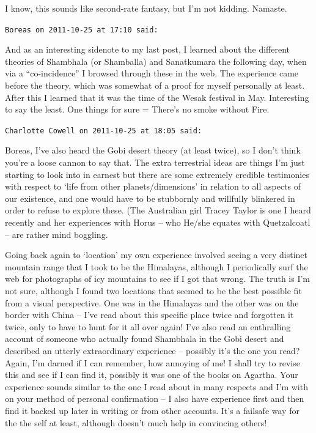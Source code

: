 \begin{footnotesize}
\begin{sffamily}
I know, this sounds like second-rate fantasy, but I'm not kidding. Namaste.

\hfill

\texttt{Boreas on 2011-10-25 at 17:10 said:}

And as an interesting sidenote to my last post, I learned about the different theories of Shambhala (or Shamballa) and Sanatkumara the following day, when via a ``co-incidence'' I browsed through these in the web. The experience came before the theory, which was somewhat of a proof for myself personally at least. After this I learned that it was the time of the Wesak festival in May. Interesting to say the least. One things for sure = There's no smoke without Fire.

\hfill

\texttt{Charlotte Cowell on 2011-10-25 at 18:05 said:}

Boreas, I've also heard the Gobi desert theory (at least twice), so I don't think you're a loose cannon to say that. The extra terrestrial ideas are things I'm just starting to look into in earnest but there are some extremely credible testimonies with respect to `life from other planets/dimensions' in relation to all aspects of our existence, and one would have to be stubbornly and willfully blinkered in order to refuse to explore these. (The Australian girl Tracey Taylor is one I heard recently and her experiences with Horus -- who He/she equates with Quetzalcoatl -- are rather mind boggling.

Going back again to `location' my own experience involved seeing a very distinct mountain range that I took to be the Himalayas, although I periodically surf the web for photographs of icy mountains to see if I got that wrong. The truth is I'm not sure, although I found two locations that seemed to be the best possible fit from a visual perspective. One was in the Himalayas and the other was on the border with China -- I've read about this specific place twice and forgotten it twice, only to have to hunt for it all over again! I've also read an enthralling account of someone who actually found Shambhala in the Gobi desert and described an utterly extraordinary experience -- possibly it's the one you read? Again, I'm darned if I can remember, how annoying of me! I shall try to revise this and see if I can find it, possibly it was one of the books on Agartha. Your experience sounds similar to the one I read about in many respects and I'm with on your method of personal confirmation -- I also have experience first and then find it backed up later in writing or from other accounts. It's a failsafe way for the the self at least, although doesn't much help in convincing others!


\end{sffamily}
\end{footnotesize}
